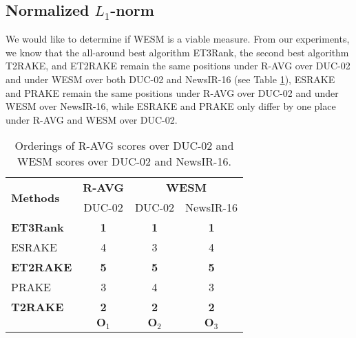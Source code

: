 \documentclass[a4paper,twoside]{article}
\begin{document}
\subsection{Normalized $L_1$-norm}

We would like to determine if WESM is a viable measure. From our experiments, we know that the all-around best algorithm ET3Rank, the second best
algorithm T2RAKE, and ET2RAKE remain the same positions under R-AVG over DUC-02 and under WESM over both DUC-02 and NewsIR-16 (see Table \ref{ordering}),
ESRAKE and PRAKE remain the same positions under R-AVG over DUC-02 and under WESM over NewsIR-16, while ESRAKE and PRAKE only differ by one place under R-AVG and WESM over DUC-02.
\begin{table}[h]
\begin{center}
\caption{\label{ordering} Orderings of R-AVG scores over DUC-02 and
WESM scores over DUC-02 and NewsIR-16.}
\begin{tabular}{l|c|c|c}
\hline
\multirow{2}{*}{\bf Methods} &
\bf R-AVG  & \multicolumn{2}{|c}{\bf WESM} \\
\cline{2-4}
& DUC-02 & DUC-02 & NewsIR-16 \\
\hline
\bf ET3Rank     &\bf 1  &\bf 1 &\bf 1  \\ %
ESRAKE          &4  &3 &4  \\ %
\bf ET2RAKE     &\bf 5  &\bf 5 &\bf 5  \\ %
PRAKE          &3  &4 &3  \\ %
\bf T2RAKE      &\bf 2  &\bf 2 &\bf 2  \\ %
\hline
& ${\bm O}_1$ & ${\bm O}_2$ & ${\bm O}_3$ \\
\hline
\end{tabular}
\end{center}
\end{table}
\end{document}
